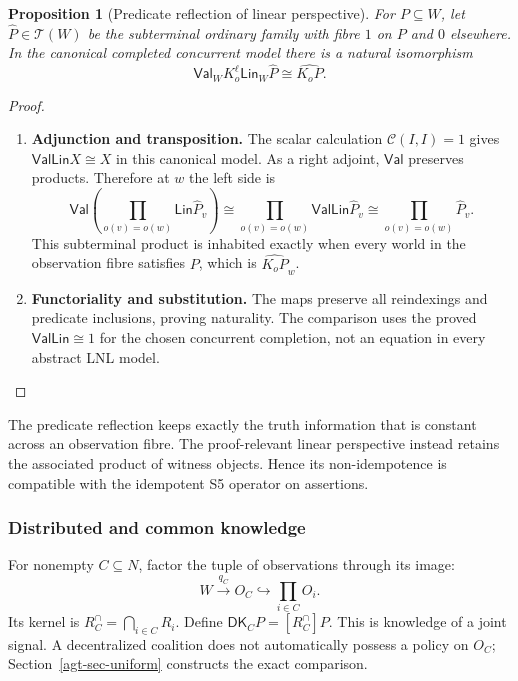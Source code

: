 \documentclass[11pt,a4paper]{article}
\numberwithin{equation}{section}
\newtheorem{proposition}[theorem]{Proposition}
\theoremstyle{definition}
\theoremstyle{remark}
\theoremstyle{plain}
\providecommand{\DK}{\mathsf{DK}}
\providecommand{\Lin}{\mathsf{Lin}}
\providecommand{\Val}{\mathsf{Val}}
\providecommand{\cC}{\mathcal{C}}
\providecommand{\cT}{\mathcal{T}}
\begin{document}
\begin{proposition}[Predicate reflection of linear perspective]
\label{agt-prop-perspective-reflection}
For $P\subseteq W$, let $\widehat P\in\cT(W)$ be the subterminal
ordinary family with fibre $1$ on $P$ and $0$ elsewhere.  In the canonical
completed concurrent model there is a natural isomorphism
\[
 \Val_W K_o^\ell\Lin_W\widehat P
 \cong\widehat{K_oP}.
\]
\end{proposition}
\begin{proof}
\leavevmode
\begin{enumerate}[label=\textup{(\arabic*)},leftmargin=*,itemsep=4pt,topsep=3pt]
  \item \textbf{Adjunction and transposition.} The scalar calculation $\cC(I,I)=1$ gives
$\Val\Lin X\cong X$ in this canonical model. As a right adjoint,
$\Val$ preserves products. Therefore at $w$ the left side is
\[
 \Val\left(\prod_{o(v)=o(w)}\Lin\widehat P_v\right)
 \cong\prod_{o(v)=o(w)}\Val\Lin\widehat P_v
 \cong\prod_{o(v)=o(w)}\widehat P_v.
\]
This subterminal product is inhabited exactly when every world in the
observation fibre satisfies $P$, which is $\widehat{K_oP}_w$.
  \item \textbf{Functoriality and substitution.} The maps preserve all reindexings and predicate inclusions, proving
naturality. The comparison uses the proved $\Val\Lin\cong1$ for the
chosen concurrent completion, not an equation in every abstract LNL
model.
\end{enumerate}
\end{proof}

The predicate reflection keeps exactly the truth information that
is constant across an observation fibre. The proof-relevant linear
perspective instead retains the associated product of witness objects.
Hence its non-idempotence is compatible with the idempotent S5 operator
on assertions.

\subsubsection{Distributed and common knowledge}

For nonempty $C\subseteq N$, factor the tuple of observations through its
image:
\[
 W\xrightarrow{q_C}O_C\hookrightarrow\prod_{i\in C}O_i.
\]
Its kernel is $R_C^{\cap}=\bigcap_{i\in C}R_i$. Define
$\DK_CP=[R_C^{\cap}]P$. This is knowledge of a joint signal. A
decentralized coalition does not automatically possess a policy on $O_C$;
Section~\ref{agt-sec-uniform} constructs the exact comparison.
\end{document}
